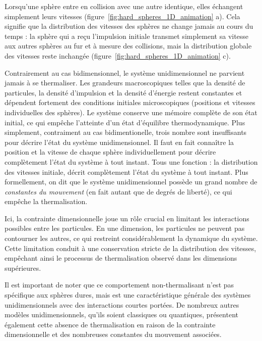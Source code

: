 \smallskip

Lorsqu'une sphère entre en collision avec une autre identique, elles échangent simplement leurs vitesses (figure~\ref{fig:hard_spheres_1D_animation} a). Cela signifie que la distribution des vitesses des sphères ne change jamais au cours du temps : la sphère qui a reçu l'impulsion initiale transmet simplement sa vitesse aux autres sphères au fur et à mesure des collisions, mais la distribution globale des vitesses reste inchangée (figure~\ref{fig:hard_spheres_1D_animation} c).

\smallskip

Contrairement au cas bidimensionnel, le système unidimensionnel ne parvient jamais à se thermaliser. Les grandeurs macroscopiques telles que la densité de particules, la densité d'impulsion et la densité d'énergie restent constantes et dépendent fortement des conditions initiales microscopiques (positions et vitesses individuelles des sphères). Le système conserve une mémoire complète de son état initial, ce qui empêche l'atteinte d'un état d'équilibre thermodynamique.
Plus simplement, contraiment au cas bidimentionelle, trois nombre sont insuffisants pour décrire l'état du système unidimensionnel. Il faut en fait connaître la position et la vitesse de chaque sphère individuellement pour décrire complètement l'état du système à tout instant. Tous une fonction : la distribution des vitesses initiale, décrit complètement l'état du système à tout instant.
Plus formellement, on dit que le système unidimensionnel possède un grand nombre de \textit{constantes du mouvement} (en fait autant que de degrés de liberté), ce qui empêche la thermalisation.

\smallskip

Ici, la contrainte dimensionnelle joue un rôle crucial en limitant les interactions possibles entre les particules. En une dimension, les particules ne peuvent pas contourner les autres, ce qui restreint considérablement la dynamique du système. Cette limitation conduit à une conservation stricte de la distribution des vitesses, empêchant ainsi le processus de thermalisation observé dans les dimensions supérieures.

\smallskip

Il est important de noter que ce comportement non-thermalisant n'est pas spécifique aux sphères dures, mais est une caractéristique générale des systèmes unidimensionnels avec des interactions courtes portées. De nombreux autres modèles unidimensionnels, qu'ils soient classiques ou quantiques, présentent également cette absence de thermalisation en raison de la contrainte dimensionnelle et des nombreuses constantes du mouvement associées.

